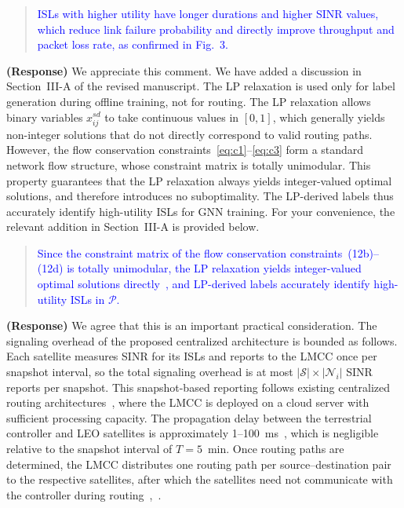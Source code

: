 \documentclass[letter]{article}
\begin{document}
\begin{quote}
\textcolor{blue}{ISLs with higher utility have longer durations and higher SINR values, which reduce link failure probability and directly improve throughput and packet loss rate, as confirmed in Fig.~3.}
\end{quote}

\vspace{10mm}
\noindent {}

\vspace{5mm}
{\bf (Response)}
We appreciate this comment. We have added a discussion in Section~III-A of the revised manuscript. The LP relaxation is used only for label generation during offline training, not for routing. The LP relaxation allows binary variables $x_{ij}^{sd}$ to take continuous values in $[0,1]$, which generally yields non-integer solutions that do not directly correspond to valid routing paths. However, the flow conservation constraints~\eqref{eq:c1}--\eqref{eq:c3} form a standard network flow structure, whose constraint matrix is totally unimodular. This property guarantees that the LP relaxation always yields integer-valued optimal solutions, and therefore introduces no suboptimality. The LP-derived labels thus accurately identify high-utility ISLs for GNN training. For your convenience, the relevant addition in Section~III-A is provided below.

\begin{quote}
\textcolor{blue}{Since the constraint matrix of the flow conservation constraints~(12b)--(12d) is totally unimodular, the LP relaxation yields integer-valued optimal solutions directly~\cite{zhao2022link}, and LP-derived labels accurately identify high-utility ISLs in $\mathcal{P}$.}
\end{quote}

\vspace{10mm}
\noindent {}

\vspace{5mm}
{\bf (Response)}
We agree that this is an important practical consideration. The signaling overhead of the proposed centralized architecture is bounded as follows. Each satellite measures SINR for its ISLs and reports to the LMCC once per snapshot interval, so the total signaling overhead is at most $|\mathcal{S}| \times |\mathcal{N}_i|$ SINR reports per snapshot. This snapshot-based reporting follows existing centralized routing architectures~\cite{han2023time}, where the LMCC is deployed on a cloud server with sufficient processing capacity. The propagation delay between the terrestrial controller and LEO satellites is approximately 1--100~ms~\cite{hu2022software}, which is negligible relative to the snapshot interval of $T = 5$~min. Once routing paths are determined, the LMCC distributes one routing path per source--destination pair to the respective satellites, after which the satellites need not communicate with the controller during routing~\cite{hu2022software},~\cite{huang2026dynamic}.
\end{document}
